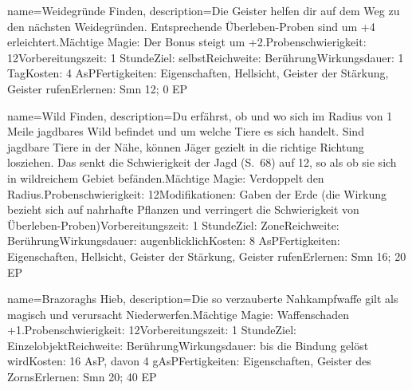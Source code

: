 {
    name={Weidegründe Finden},
    description={Die Geister helfen dir auf dem Weg zu den nächsten Weidegründen. Entsprechende Überleben-Proben sind um +4 erleichtert.\newline Mächtige Magie: Der Bonus steigt um +2.\newline Probenschwierigkeit: 12\newline Vorbereitungszeit: 1 Stunde\newline Ziel: selbst\newline Reichweite: Berührung\newline Wirkungsdauer: 1 Tag\newline Kosten: 4 AsP\newline Fertigkeiten: Eigenschaften, Hellsicht, Geister der Stärkung, Geister rufen\newline Erlernen: Smn 12; 0 EP}
}


{
    name={Wild Finden},
    description={Du erfährst, ob und wo sich im Radius von 1 Meile jagdbares Wild befindet und um welche Tiere es sich handelt. Sind jagdbare Tiere in der Nähe, können Jäger gezielt in die richtige Richtung losziehen. Das senkt die Schwierigkeit der Jagd (S. 68) auf 12, so als ob sie sich in wildreichem Gebiet befänden.\newline Mächtige Magie: Verdoppelt den Radius.\newline Probenschwierigkeit: 12\newline Modifikationen: Gaben der Erde (die Wirkung bezieht sich auf nahrhafte Pflanzen und verringert die Schwierigkeit von Überleben-Proben)\newline Vorbereitungszeit: 1 Stunde\newline Ziel: Zone\newline Reichweite: Berührung\newline Wirkungsdauer: augenblicklich\newline Kosten: 8 AsP\newline Fertigkeiten: Eigenschaften, Hellsicht, Geister der Stärkung, Geister rufen\newline Erlernen: Smn 16; 20 EP}
}


{
    name={Brazoraghs Hieb},
    description={Die so verzauberte Nahkampfwaffe gilt als magisch und verursacht Niederwerfen.\newline Mächtige Magie: Waffenschaden +1.\newline Probenschwierigkeit: 12\newline Vorbereitungszeit: 1 Stunde\newline Ziel: Einzelobjekt\newline Reichweite: Berührung\newline Wirkungsdauer: bis die Bindung gelöst wird\newline Kosten: 16 AsP, davon 4 gAsP\newline Fertigkeiten: Eigenschaften, Geister des Zorns\newline Erlernen: Smn 20; 40 EP}
}


